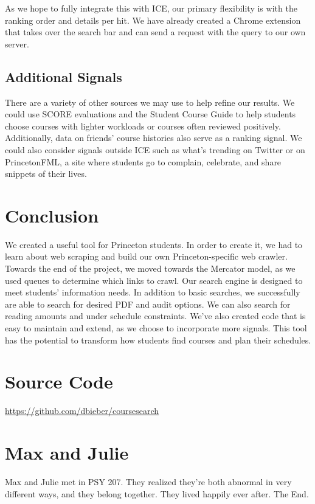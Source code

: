 \documentclass[12pt,letterpaper]{article}
\begin{document}
As we hope to fully integrate this with ICE, our primary flexibility is with the ranking order and details per hit. We have already created a Chrome extension that takes over the search bar and can send a request with the query to our own server.

\subsection{Additional Signals}

There are a variety of other sources we may use to help refine our results. We could use SCORE evaluations and the Student Course Guide to help students choose courses with lighter workloads or courses often reviewed positively. Additionally, data on friends' course histories also serve as a ranking signal. We could also consider signals outside ICE such as what's trending on Twitter or on PrincetonFML, a site where students go to complain, celebrate, and share snippets of their lives.

\section{Conclusion}

We created a useful tool for Princeton students. In order to create it, we had to learn about web scraping and build our own Princeton-specific web crawler. Towards the end of the project, we moved towards the Mercator model, as we used queues to determine which links to crawl.
Our search engine is designed to meet students' information needs. In addition to basic searches, we successfully are able to search for desired PDF and audit options. We can also search for reading amounts and under schedule constraints. We've also created code that is easy to maintain and extend, as we choose to incorporate more signals. This tool has the potential to transform how students find courses and plan their schedules. 


\appendix

\section{Source Code}
\url{https://github.com/dbieber/coursesearch}

\section{Max and Julie}
Max and Julie met in PSY 207. They realized they're both abnormal in very different ways, and they belong together. They lived happily ever after. The End.
\end{document}
